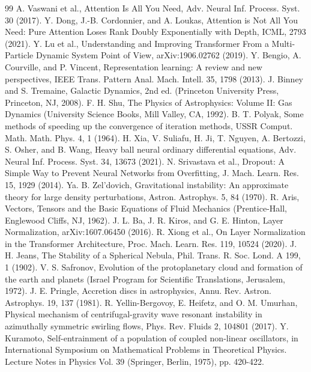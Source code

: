 \documentclass[10pt]{article}
\begin{document}
\begin{thebibliography}{99}
 A. Vaswani et al., Attention Is All You Need, Adv. Neural Inf. Process. Syst. 30 (2017).
 Y. Dong, J.-B. Cordonnier, and A. Loukas, Attention is Not All You Need: Pure Attention Loses Rank Doubly Exponentially with Depth, ICML, 2793 (2021).
 Y. Lu et al., Understanding and Improving Transformer From a Multi-Particle Dynamic System Point of View, arXiv:1906.02762 (2019).
 Y. Bengio, A. Courville, and P. Vincent, Representation learning: A review and new perspectives, IEEE Trans. Pattern Anal. Mach. Intell. 35, 1798 (2013).
 J. Binney and S. Tremaine, Galactic Dynamics, 2nd ed. (Princeton University Press, Princeton, NJ, 2008).
 F. H. Shu, The Physics of Astrophysics: Volume II: Gas Dynamics (University Science Books, Mill Valley, CA, 1992).
 B. T. Polyak, Some methods of speeding up the convergence of iteration methods, USSR Comput. Math. Math. Phys. 4, 1 (1964).
 H. Xia, V. Suliafu, H. Ji, T. Nguyen, A. Bertozzi, S. Osher, and B. Wang, Heavy ball neural ordinary differential equations, Adv. Neural Inf. Process. Syst. 34, 13673 (2021).
 N. Srivastava et al., Dropout: A Simple Way to Prevent Neural Networks from Overfitting, J. Mach. Learn. Res. 15, 1929 (2014).
 Ya. B. Zel'dovich, Gravitational instability: An approximate theory for large density perturbations, Astron. Astrophys. 5, 84 (1970).
 R. Aris, Vectors, Tensors and the Basic Equations of Fluid Mechanics (Prentice-Hall, Englewood Cliffs, NJ, 1962).
 J. L. Ba, J. R. Kiros, and G. E. Hinton, Layer Normalization, arXiv:1607.06450 (2016).
 R. Xiong et al., On Layer Normalization in the Transformer Architecture, Proc. Mach. Learn. Res. 119, 10524 (2020).
 J. H. Jeans, The Stability of a Spherical Nebula, Phil. Trans. R. Soc. Lond. A 199, 1 (1902).
 V. S. Safronov, Evolution of the protoplanetary cloud and formation of the earth and planets (Israel Program for Scientific Translations, Jerusalem, 1972).
 J. E. Pringle, Accretion discs in astrophysics, Annu. Rev. Astron. Astrophys. 19, 137 (1981).
 R. Yellin-Bergovoy, E. Heifetz, and O. M. Umurhan, Physical mechanism of centrifugal-gravity wave resonant instability in azimuthally symmetric swirling flows, Phys. Rev. Fluids 2, 104801 (2017).
 Y. Kuramoto, Self-entrainment of a population of coupled non-linear oscillators, in International Symposium on Mathematical Problems in Theoretical Physics. Lecture Notes in Physics Vol. 39 (Springer, Berlin, 1975), pp. 420-422.

\end{thebibliography}
\end{document}
